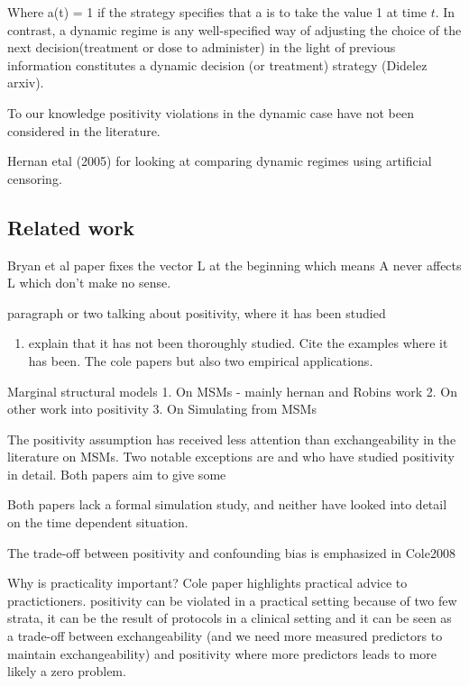 \documentclass[11pt]{article}
\providecommand{\tightlist}{%
      \setlength{\itemsep}{0pt}\setlength{\parskip}{0pt}}
\begin{document}
Where a(t) = 1 if the strategy specifies that a is to take the value 1
at time \(t\). In contrast, a dynamic regime is any well-specified way
of adjusting the choice of the next decision(treatment or dose to
administer) in the light of previous information constitutes a dynamic
decision (or treatment) strategy (Didelez arxiv).

To our knowledge positivity violations in the dynamic case have not been
considered in the literature.

Hernan etal (2005) for looking at comparing dynamic regimes using
artificial censoring.

    \subsection{Related work}\label{related-work}

Bryan et al paper fixes the vector L at the beginning which means A
never affects L which don't make no sense.

paragraph or two talking about positivity, where it has been studied

\begin{enumerate}
\def\labelenumi{\arabic{enumi}.}
\setcounter{enumi}{2}
\tightlist
\item
  explain that it has not been thoroughly studied. Cite the examples
  where it has been. The cole papers but also two empirical
  applications.
\end{enumerate}

Marginal structural models 1. On MSMs - mainly hernan and Robins work 2.
On other work into positivity 3. On Simulating from MSMs

The positivity assumption has received less attention than
exchangeability in the literature on MSMs. Two notable exceptions are
\citet{Cole009} and \citet{Westereich2009} who have studied positivity
in detail. Both papers aim to give some

Both papers lack a formal simulation study, and neither have looked into
detail on the time dependent situation.

The trade-off between positivity and confounding bias is emphasized in
Cole2008

Why is practicality important? Cole paper highlights practical advice to
practictioners. positivity can be violated in a practical setting
because of two few strata, it can be the result of protocols in a
clinical setting and it can be seen as a trade-off between
exchangeability (and we need more measured predictors to maintain
exchangeability) and positivity where more predictors leads to more
likely a zero problem.
\end{document}
